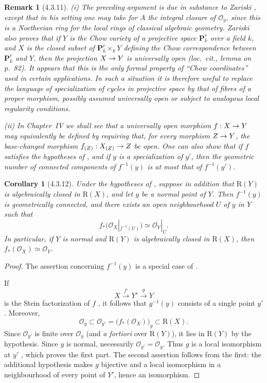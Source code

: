 \documentclass[oneside]{amsart}
\theoremstyle{ega-env-style}
\theoremstyle{ega-thm-env-style}
\newtheorem*{corollary}{Corollary}
\theoremstyle{ega-defn-env-style}
\newtheorem*{remark}{Remark}
\def\mathcal{\mathscr}
\def\sh{\mathcal}                   %
\renewcommand{\to}{\mathchoice{\longrightarrow}{\rightarrow}{\rightarrow}{\rightarrow}}
\newcommand{\oldpage}[2][]{{\marginnote{\normalfont{\textbf{#1}~|~#2}}}\ignorespaces}
\let\EGAOriginalLabel\label
\renewcommand{\label}[1]{\phantomsection\EGAOriginalLabel{#1}}
\begin{document}
\begin{remark}[4.3.11]
\label{III.4.3.11}
\emph{(i)}
The preceding argument is due in substance to Zariski
\cite{I-20}, except that in his setting one may take for $A$ the
integral closure of $\sh{O}_y$, since this is a Noetherian ring for
the local rings of classical algebraic geometry.  Zariski also
proves that if $Y$ is the Chow variety of a projective space
$\mathbf{P}_k^r$ over a field $k$, and $X$ is the closed subset of
$\mathbf{P}_k^r\times_kY$ defining the Chow correspondence between
$\mathbf{P}_k^r$ and $Y$, then the projection $X\to Y$ is
universally open (\emph{loc.\ cit.}, lemma on p.~82).
It appears that this is the only formal property of ``Chow
coordinates'' used in certain applications.  In such a situation it
is therefore useful to replace the language of specialization of
cycles in projective space by that of fibres of a proper morphism,
possibly assumed universally open or subject to analogous local
regularity conditions.

\emph{(ii)}
In Chapter~IV we shall see that a universally open morphism
$f:X\to Y$ may equivalently be defined by requiring that, for every
morphism $Z\to Y$, the base-changed morphism
$f_{(Z)}:X_{(Z)}\to Z$ be open.  One can also show that if $f$
satisfies the hypotheses of , and if $y$ is a
specialization of $y'$, then the geometric number of connected
components of $f^{-1}(y)$ is at most that of $f^{-1}(y')$.
\end{remark}

\begin{corollary}[4.3.12]
\label{III.4.3.12}
Under the hypotheses of , suppose in addition that
$\mathrm{R}(Y)$ is algebraically closed in $\mathrm{R}(X)$, and let $y$ be a
normal point of $Y$.  Then $f^{-1}(y)$ is geometrically connected,
and there exists an open neighbourhood $U$ of $y$ in $Y$ such that
\[
  f_*\bigl(\sh{O}_X|_{f^{-1}(U)}\bigr)
  \simeq
  \sh{O}_Y|_U.
\]
In particular, if $Y$ is normal and $\mathrm{R}(Y)$ is algebraically closed
in $\mathrm{R}(X)$, then $f_*(\sh{O}_X)\simeq\sh{O}_Y$.
\end{corollary}

\begin{proof}
The assertion concerning $f^{-1}(y)$ is a special case of
.

\oldpage[III]{135}

If
\[
  X\xrightarrow{f'}Y'\xrightarrow{g}Y
\]
is the Stein factorization of $f$ , it follows that
$g^{-1}(y)$ consists of a single point $y'$.  Moreover,
\[
  \sh{O}_y
  \subset
  \sh{O}_{y'}
  =
  \bigl(f_*(\sh{O}_X)\bigr)_y
  \subset
  \mathrm{R}(X).
\]
Since $\sh{O}_{y'}$ is finite over $\sh{O}_y$ (and \emph{a
fortiori} over $\mathrm{R}(Y)$), it lies in $\mathrm{R}(Y)$ by the
hypothesis.  Since
$y$ is normal, necessarily $\sh{O}_{y'}=\sh{O}_y$.  Thus $g$ is a
local isomorphism at $y'$ , which proves the first
part.  The second assertion follows from the first: the additional
hypothesis makes $g$ bijective and a local isomorphism in a
neighbourhood of every point of $Y'$, hence an isomorphism.
\end{proof}
\end{document}
